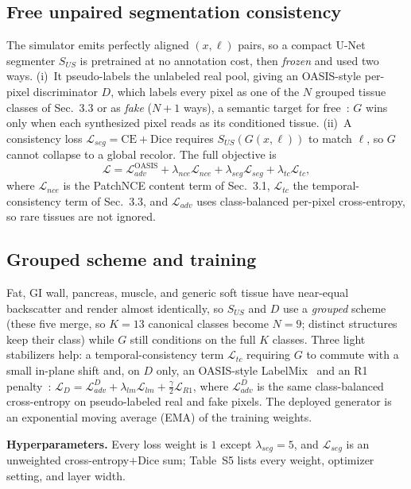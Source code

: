 \documentclass[runningheads]{llncs}
\begin{document}
\subsection{Free unpaired segmentation consistency}
The simulator emits perfectly aligned $(x,\ell)$ pairs, so a compact U-Net~\cite{ronneberger2015unet}
segmenter $S_{US}$ is pretrained at no annotation cost, then \emph{frozen} and used two ways. (i)~It
pseudo-labels the unlabeled real pool, giving an OASIS-style per-pixel discriminator $D$, which labels every
pixel as one of the $N$ grouped tissue classes of Sec.~3.3 or as \emph{fake} ($N{+}1$ ways), a
semantic target for free~\cite{sushko2021oasis}: $G$ wins only when each synthesized pixel reads as its
conditioned tissue. (ii)~A consistency loss $\mathcal{L}_{seg}=\mathrm{CE}+\mathrm{Dice}$ requires
$S_{US}(G(x,\ell))$ to match $\ell$, so $G$ cannot collapse to a global recolor. The full objective is
\begin{equation}
\mathcal{L}=\mathcal{L}_{adv}^{\text{OASIS}}+\lambda_{nce}\mathcal{L}_{nce}
+\lambda_{seg}\mathcal{L}_{seg}+\lambda_{tc}\mathcal{L}_{tc},
\end{equation}
where $\mathcal{L}_{nce}$ is the PatchNCE content term of Sec.~3.1, $\mathcal{L}_{tc}$ the temporal-consistency term of Sec.~3.3, and $\mathcal{L}_{adv}$ uses class-balanced per-pixel cross-entropy, so rare tissues are not ignored.

\subsection{Grouped scheme and training}
Fat, GI wall, pancreas, muscle, and generic soft tissue have near-equal backscatter and render almost
identically, so $S_{US}$ and $D$ use a \emph{grouped} scheme (these five merge, so $K{=}13$ canonical classes become $N{=}9$; distinct structures keep
their class) while $G$ still conditions on the full $K$ classes. Three light stabilizers help: a
temporal-consistency term $\mathcal{L}_{tc}$ requiring $G$ to commute with a small in-plane shift and,
on $D$ only, an OASIS-style LabelMix~\cite{sushko2021oasis,yun2019cutmix} and an R1
penalty~\cite{mescheder2018r1}:
$\mathcal{L}_D=\mathcal{L}_{adv}^{D}+\lambda_{lm}\mathcal{L}_{lm}+\tfrac{\gamma}{2}\mathcal{L}_{R1}$,
where $\mathcal{L}_{adv}^{D}$ is the same class-balanced cross-entropy on pseudo-labeled real and fake
pixels. The deployed generator is an exponential moving average (EMA) of the training weights.

\noindent\textbf{Hyperparameters.} Every loss weight is $1$ except $\lambda_{seg}{=}5$, and
$\mathcal{L}_{seg}$ is an unweighted cross-entropy${+}$Dice sum; Table~S5 lists every weight, optimizer
setting, and layer width.
\end{document}
